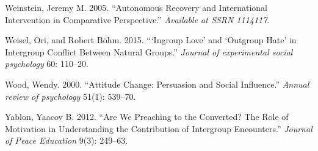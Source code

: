 \documentclass[11pt]{article}
\begin{document}
\leavevmode\hypertarget{ref-weinstein2005autonomous}{}%
Weinstein, Jeremy M. 2005. ``Autonomous Recovery and International
Intervention in Comparative Perspective.'' \emph{Available at SSRN
1114117}.

\leavevmode\hypertarget{ref-weisel2015ingroup}{}%
Weisel, Ori, and Robert Böhm. 2015. ```Ingroup Love' and `Outgroup Hate'
in Intergroup Conflict Between Natural Groups.'' \emph{Journal of
experimental social psychology} 60: 110--20.

\leavevmode\hypertarget{ref-wood2000attitude}{}%
Wood, Wendy. 2000. ``Attitude Change: Persuasion and Social Influence.''
\emph{Annual review of psychology} 51(1): 539--70.

\leavevmode\hypertarget{ref-yablon2012we}{}%
Yablon, Yaacov B. 2012. ``Are We Preaching to the Converted? The Role of
Motivation in Understanding the Contribution of Intergroup Encounters.''
\emph{Journal of Peace Education} 9(3): 249--63.
\end{document}
